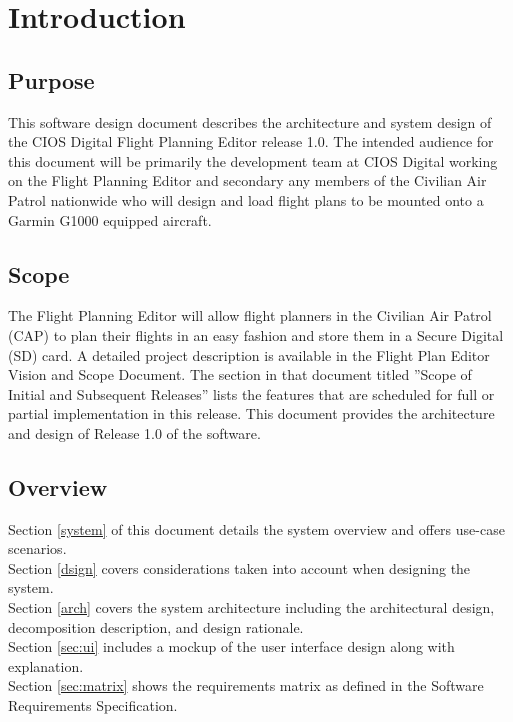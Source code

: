 \documentclass[12pt, letterpaper]{article}
\begin{document}
\newpage
\tableofcontents
\newpage

\pagestyle{style1}
\setcounter{page}{1}

\section{Introduction}
  \subsection{Purpose}
    This software design document describes the architecture and system design of the CIOS Digital Flight Planning Editor release 1.0.
    The intended audience for this document will be primarily the development team at CIOS Digital working on the Flight Planning Editor and secondary any members of the Civilian Air Patrol nationwide who will design and load flight plans to be mounted onto a Garmin G1000 equipped aircraft.

  \subsection{Scope}
    The Flight Planning Editor will allow flight planners in the Civilian Air Patrol (CAP) to plan their flights in an easy fashion and store them in a Secure Digital (SD) card. A detailed project description is available in the Flight Plan Editor Vision and Scope Document. The section in that document titled ”Scope of Initial and Subsequent Releases” lists the features that are scheduled for full or partial implementation in this release.
    This document provides the architecture and design of Release 1.0 of the software.

   \subsection{Overview}
     Section \ref{system} of this document details the system overview and offers use-case scenarios. \\
     Section \ref{dsign} covers considerations taken into account when designing the system.\\
     Section \ref{arch} covers the system architecture including the architectural design, decomposition description, and design rationale. \\
     Section \ref{sec:ui} includes a mockup of the user interface design along with explanation. \\
     Section \ref{sec:matrix} shows the requirements matrix as defined in the Software Requirements Specification.\\
\end{document}
